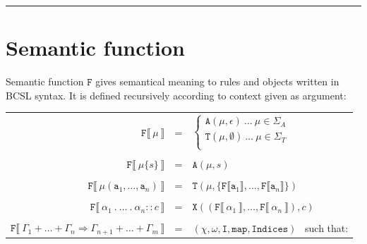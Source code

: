 \documentclass[12pt]{fithesis2}
\begin{document}
\noindent\rule{\textwidth}{1pt}

\section{Semantic function}

Semantic function $\mathtt{F}$ gives semantical meaning to rules and objects written in BCSL syntax. It is defined recursively according to context given as argument:

\begin{center}
\begin{tabular}{ r c l}
$\mathtt{F} \llbracket ~\mu~ \rrbracket$ & = &
		$\begin{cases}
		\mathtt{A}(\mu, \epsilon) ~\ldots~ \mu \in \Sigma_{A}\\
		\mathtt{T}(\mu, \emptyset) ~\ldots~ \mu \in \Sigma_{T}\\
		\end{cases}
		$\\
 & & \\
$\mathtt{F} \llbracket ~\mu\{s\}~ \rrbracket$ & = & $\mathtt{A}(\mu, s)$\\
 & & \\
$\mathtt{F} \llbracket ~\mu(\mathtt{a}_1, \ldots, \mathtt{a}_n)~ \rrbracket$ & = &
$\mathtt{T}(\mu, \{ \mathtt{F} \llbracket \mathtt{a}_1 \rrbracket, \ldots, \mathtt{F} \llbracket \mathtt{a}_n \rrbracket \})$\\
 & & \\
$\mathtt{F} \llbracket ~\alpha_1~.~\ldots~.~\alpha_n :: c~ \rrbracket$ & = &
$\mathtt{X}((\mathtt{F} \llbracket ~\alpha_1~ \rrbracket, \ldots, \mathtt{F} \llbracket ~\alpha_n~ \rrbracket), c)$\\
 & & \\
$\mathtt{F} \llbracket ~\Gamma_1 + \ldots + \Gamma_n \Rightarrow \Gamma_{n+1} + \ldots + \Gamma_m~ \rrbracket$ & = &
$(\chi, \omega, \mathtt{I}, \mathtt{map}, \mathtt{Indices})$~ such that:\\
\end{tabular}
\end{center}
\end{document}
